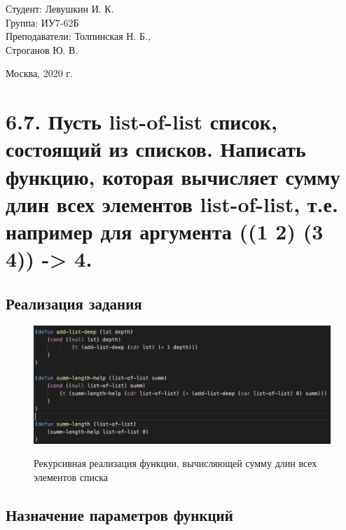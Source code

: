 \documentclass[a4paper,12pt]{article}
\begin{document}
	\vspace*{15mm} 	
	
	\large
	\begin{flushright}
		Студент: Левушкин И. К. \\
		Группа: ИУ7-62Б \\
		Преподаватели: Толпинская Н. Б., \\ Строганов Ю. В. \\
	\end{flushright}
	
	\vspace*{30mm}
	\begin{center}
		Москва, 2020 г.  
	\end{center}
	\thispagestyle{empty}
	
	
	\newpage
	
	\section*{6.7. Пусть list-of-list список, состоящий из списков. Написать функцию, которая вычисляет сумму длин всех элементов list-of-list, т.е. например для аргумента ((1 2) (3 4)) -> 4.  
	 }
 
 	\subsection*{Реализация задания}
 	
 	\begin{figure}[h!]
 		\begin{center}
 			{\includegraphics[scale = 0.7]{6.7.png}}
 			\label{ris:6.7}
 		\end{center}
 	\caption{Рекурсивная реализация функции, вычисляющей сумму длин всех элементов списка}
 	\end{figure}
 	
 	\subsection*{Назначение параметров функций}
 	
\end{document}
